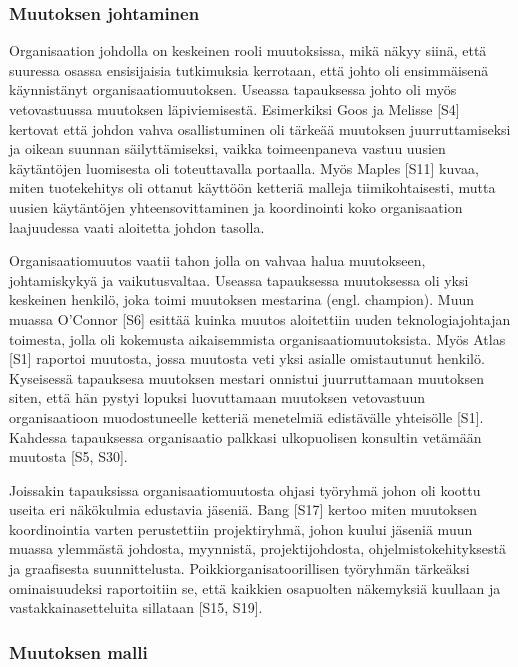 \subsubsection{Muutoksen johtaminen}

Organisaation johdolla on keskeinen rooli muutoksissa, mikä näkyy siinä, että
suuressa osassa ensisijaisia tutkimuksia kerrotaan, että johto oli ensimmäisenä
käynnistänyt organisaatiomuutoksen. Useassa tapauksessa johto oli myös
vetovastuussa muutoksen läpiviemisestä. Esimerkiksi Goos ja Melisse [S4]
kertovat että johdon vahva osallistuminen oli tärkeää muutoksen juurruttamiseksi
ja oikean suunnan säilyttämiseksi, vaikka toimeenpaneva vastuu uusien
käytäntöjen luomisesta oli toteuttavalla portaalla. Myös Maples [S11] kuvaa,
miten tuotekehitys oli ottanut käyttöön ketteriä malleja tiimikohtaisesti, mutta
uusien käytäntöjen yhteensovittaminen ja koordinointi koko organisaation
laajuudessa vaati aloitetta johdon tasolla.

Organisaatiomuutos vaatii tahon jolla on vahvaa halua muutokseen, johtamiskykyä
ja vaikutusvaltaa. Useassa tapauksessa muutoksessa oli yksi keskeinen henkilö,
joka toimi muutoksen mestarina (engl. champion). Muun muassa O'Connor [S6]
esittää kuinka muutos aloitettiin uuden teknologiajohtajan toimesta, jolla oli
kokemusta aikaisemmista organisaatiomuutoksista. Myös Atlas [S1] raportoi
muutosta, jossa muutosta veti yksi asialle omistautunut henkilö. Kyseisessä
tapauksesa muutoksen mestari onnistui juurruttamaan muutoksen siten, että hän
pystyi lopuksi luovuttamaan muutoksen vetovastuun organisaatioon muodostuneelle
ketteriä menetelmiä edistävälle yhteisölle [S1]. Kahdessa tapauksessa
organisaatio palkkasi ulkopuolisen konsultin vetämään muutosta [S5, S30].

Joissakin tapauksissa organisaatiomuutosta ohjasi työryhmä johon oli koottu
useita eri näkökulmia edustavia jäseniä. Bang [S17] kertoo miten muutoksen
koordinointia varten perustettiin projektiryhmä, johon kuului jäseniä muun
muassa ylemmästä johdosta, myynnistä, projektijohdosta, ohjelmistokehityksestä
ja graafisesta suunnittelusta. Poikkiorganisatoorillisen työryhmän tärkeäksi
ominaisuudeksi raportoitiin se, että kaikkien osapuolten näkemyksiä kuullaan ja
vastakkainasetteluita sillataan [S15, S19].

\subsubsection{Muutoksen malli}

